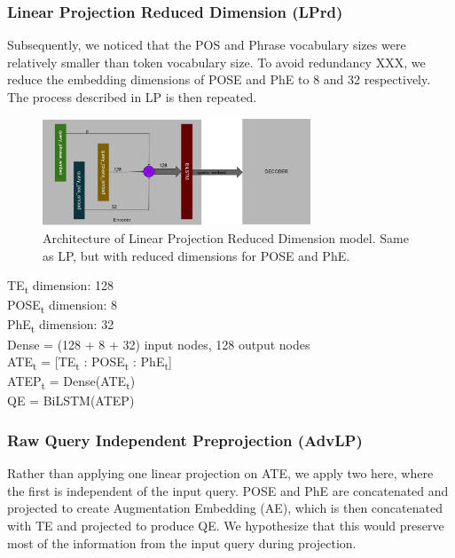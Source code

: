 \documentclass{IEEEtran}
\begin{document}
        \subsubsection{Linear Projection Reduced Dimension (LPrd)} 
        Subsequently, we noticed that the POS and Phrase vocabulary sizes were relatively smaller
        than token vocabulary size. To avoid redundancy XXX, we reduce the embedding dimensions
        of POSE and PhE to 8 and 32 respectively. The process described in LP is then repeated. \\

        \begin{figure}[h]
          \centering
          \includegraphics[width=8cm]{lprd.png}
          \caption{Architecture of Linear Projection Reduced Dimension model. Same as LP, but with
          reduced dimensions for POSE and PhE.}
          \label{fig:lprd}
        \end{figure}

        \hspace*{-3.5mm}TE\textsubscript{t} dimension: 128 \\
        POSE\textsubscript{t} dimension: 8 \\
        PhE\textsubscript{t} dimension: 32 \\
        Dense = (128 + 8 + 32) input nodes, 128 output nodes \\ 

        \hspace*{-3.5mm}ATE\textsubscript{t} = [TE\textsubscript{t} : 
        POSE\textsubscript{t} : PhE\textsubscript{t}] \\
        ATEP\textsubscript{t} = Dense(ATE\textsubscript{t}) \\
        QE = BiLSTM(ATEP) \\

        \subsubsection{Raw Query Independent Preprojection (AdvLP)}
        Rather than applying one linear projection on ATE, we apply two here, where the first is 
        independent of the input query. POSE and PhE are concatenated and projected to create
        Augmentation Embedding (AE), which is then concatenated with TE and projected to produce
        QE. We hypothesize that this would preserve most of the information from the input query
        during projection. \\
\end{document}
